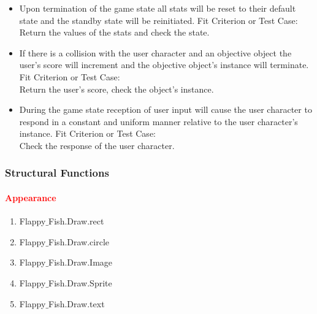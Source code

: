 \documentclass[11pt, oneside]{article}   	%
\begin{document}
\begin{itemize}
\item
Upon termination of the game state all stats will be reset to their default state and the standby state will be reinitiated.
\subitem
Fit Criterion or Test Case: \\
Return the values of the stats and check the state.

\item
If there is a collision with the user character and an objective object the user's score will increment and the objective object's instance will terminate.
\subitem
Fit Criterion or Test Case: \\
Return the user's score, check the object's instance.

\item
During the game state reception of user input will cause the user character to respond in a constant and uniform manner relative to the user character's instance.
\subitem
Fit Criterion or Test Case: \\
Check the response of the user character.

\end{itemize}

\subsubsection{Structural Functions}

\paragraph{\textcolor{red}{Appearance }}
\begin{enumerate}
\item Flappy$\_$Fish.Draw.rect

\item Flappy$\_$Fish.Draw.circle

\item Flappy$\_$Fish.Draw.Image

\item Flappy$\_$Fish.Draw.Sprite

\item Flappy$\_$Fish.Draw.text
\end{enumerate}
\end{document}
